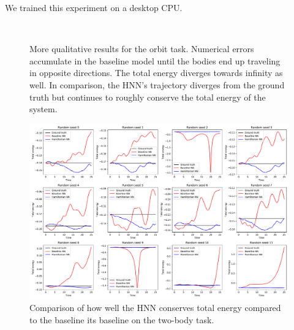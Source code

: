 \documentclass{article}
\begin{document}
We trained this experiment on a desktop CPU.

\begin{figure}[H]
\centering
{}\\
\caption{More qualitative results for the orbit task. Numerical errors accumulate in the baseline model until the bodies end up traveling in opposite directions. The total energy diverges towards infinity as well. In comparison, the HNN's trajectory diverges from the ground truth but continues to roughly conserve the total energy of the system.}
\end{figure}

\begin{figure}[H]
\centering
\includegraphics[width=.95\textwidth]{static/orbits-total-energy}
\caption{Comparison of how well the HNN conserves total energy compared to the baseline its baseline on the two-body task.}
\end{figure}
\end{document}
